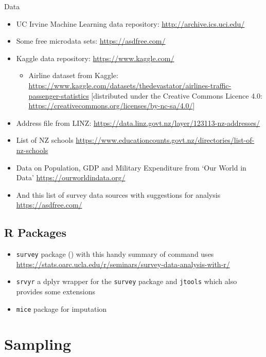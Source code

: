 \documentclass[
]{book}
\providecommand{\tightlist}{%
  \setlength{\itemsep}{0pt}\setlength{\parskip}{0pt}}
\begin{document}
Data

\begin{itemize}
\tightlist
\item
  UC Irvine Machine Learning data repository: \url{http://archive.ics.uci.edu/}
\item
  Some free microdata sets: \url{https://asdfree.com/}
\item
  Kaggle data repository: \url{https://www.kaggle.com/}

  \begin{itemize}
  \tightlist
  \item
    Airline dataset from Kaggle:
    \url{https://www.kaggle.com/datasets/thedevastator/airlines-traffic-passenger-statistics}
    {[}distributed under the Creative Commons Licence 4.0: \url{https://creativecommons.org/licenses/by-nc-sa/4.0/}{]}
  \end{itemize}
\item
  Address file from LINZ: \url{https://data.linz.govt.nz/layer/123113-nz-addresses/}
\item
  List of NZ schools \url{https://www.educationcounts.govt.nz/directories/list-of-nz-schools}
\item
  Data on Population, GDP and Military Expenditure from `Our World in Data' \url{https://ourworldindata.org/}
\item
  And this list of survey data sources with suggestions for analysis \url{https://asdfree.com/}
\end{itemize}

\section{R Packages}\label{r-packages}

\begin{itemize}
\tightlist
\item
  \texttt{survey} package (\citet{survey2004}) with this handy summary of command uses
  \url{https://stats.oarc.ucla.edu/r/seminars/survey-data-analysis-with-r/}
\item
  \texttt{srvyr} a dplyr wrapper for the \texttt{survey} package and \texttt{jtools} which also provides some extensions
\item
  \texttt{mice} package for imputation
\end{itemize}

\chapter{Sampling}\label{sampling}
\end{document}
